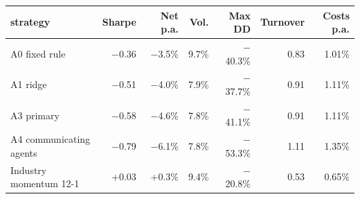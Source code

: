 \begin{tabular}{lrrrrrr}
\toprule
strategy & Sharpe & Net p.a. & Vol. & Max DD & Turnover & Costs p.a. \\
\midrule
A0 fixed rule & $-$0.36 & $-$3.5\% & 9.7\% & $-$40.3\% & 0.83 & 1.01\% \\
A1 ridge & $-$0.51 & $-$4.0\% & 7.9\% & $-$37.7\% & 0.91 & 1.11\% \\
A3 primary & $-$0.58 & $-$4.6\% & 7.8\% & $-$41.1\% & 0.91 & 1.11\% \\
A4 communicating agents & $-$0.79 & $-$6.1\% & 7.8\% & $-$53.3\% & 1.11 & 1.35\% \\
Industry momentum 12-1 & +0.03 & +0.3\% & 9.4\% & $-$20.8\% & 0.53 & 0.65\% \\
\bottomrule
\end{tabular}
